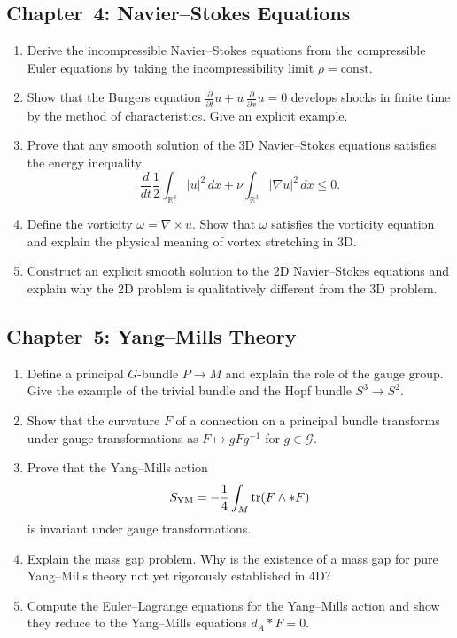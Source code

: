 \subsection{Chapter~4: Navier--Stokes Equations}

\begin{enumerate}[label=\textbf{4.\arabic*.},leftmargin=2.5em]
\item Derive the incompressible Navier--Stokes equations from the compressible Euler equations by taking the incompressibility limit $\rho = \text{const}$.

\item Show that the Burgers equation $\frac{\partial}{\partial t} u + u\, \frac{\partial}{\partial x} u = 0$ develops shocks in finite time by the method of characteristics. Give an explicit example.

\item Prove that any smooth solution of the 3D Navier--Stokes equations satisfies the energy inequality
\[
\frac{d}{dt} \frac{1}{2} \int_{\mathbb{R}^3} |u|^2 \, dx + \nu \int_{\mathbb{R}^3} |\nabla u|^2 \, dx \leq 0.
\]

\item Define the vorticity $\omega = \nabla \times u$. Show that $\omega$ satisfies the vorticity equation and explain the physical meaning of vortex stretching in 3D.

\item Construct an explicit smooth solution to the 2D Navier--Stokes equations and explain why the 2D problem is qualitatively different from the 3D problem.
\end{enumerate}

\subsection{Chapter~5: Yang--Mills Theory}

\begin{enumerate}[label=\textbf{5.\arabic*.},leftmargin=2.5em]
\item Define a principal $G$-bundle $P \to M$ and explain the role of the gauge group. Give the example of the trivial bundle and the Hopf bundle $S^3 \to S^2$.

\item Show that the curvature $F$ of a connection on a principal bundle transforms under gauge transformations as $F \mapsto g F g^{-1}$ for $g \in \mathcal{G}$.

\item Prove that the Yang--Mills action
\[
S_{\text{YM}} = -\frac{1}{4} \int_M \operatorname{tr}(F \wedge *F)
\]
is invariant under gauge transformations.

\item Explain the mass gap problem. Why is the existence of a mass gap for pure Yang--Mills theory not yet rigorously established in 4D?

\item Compute the Euler--Lagrange equations for the Yang--Mills action and show they reduce to the Yang--Mills equations $d_A *F = 0$.
\end{enumerate}

